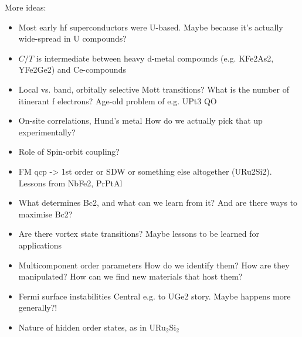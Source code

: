   More ideas: \\
  \begin{itemize}
    \item Most early hf superconductors were U-based. Maybe because it's actually wide-spread in U compounds? 
  
  \item $C/T$ is intermediate between heavy d-metal compounds (e.g. KFe2As2, YFe2Ge2) and Ce-compounds
  
  \item
  Local vs. band, orbitally selective Mott transitions? What is the number of itinerant f electrons? 
  Age-old problem of e.g. UPt3 QO
  
  \item 
  On-site correlations, Hund's metal 
  How do we actually pick that up experimentally?
  
  \item
  Role of Spin-orbit coupling?
  
  \item 
  FM qcp -> 1st order or SDW or something else altogether (URu2Si2). 
  Lessons from NbFe2, PrPtAl
  
  \item 
  What determines Bc2, and what can we learn from it? 
  And are there ways to maximise Bc2?
  
  \item 
  Are there vortex state transitions?
  Maybe lessons to be learned for applications
  
  \item 
  Multicomponent order parameters
  How do we identify them? How are they manipulated? How can we find new materials that host them?
  
  \item 
  Fermi surface instabilities
  Central e.g. to UGe2 story. Maybe happens more generally?!
  
  \item Nature of hidden order states, as in URu$_2$Si$_2$
  
  \end{itemize}
  
